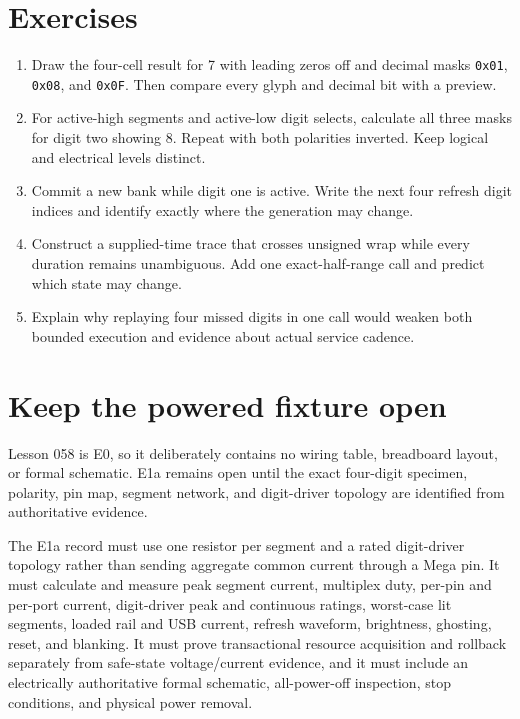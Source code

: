 \documentclass[10pt]{article}
\begin{document}
\section{Exercises}
\begin{enumerate}
 \item Draw the four-cell result for 7 with leading zeros off and decimal
       masks \texttt{0x01}, \texttt{0x08}, and \texttt{0x0F}. Then compare
       every glyph and decimal bit with a preview.
 \item For active-high segments and active-low digit selects, calculate all
       three masks for digit two showing 8. Repeat with both polarities
       inverted. Keep logical and electrical levels distinct.
 \item Commit a new bank while digit one is active. Write the next four
       refresh digit indices and identify exactly where the generation may
       change.
 \item Construct a supplied-time trace that crosses unsigned wrap while every
       duration remains unambiguous. Add one exact-half-range call and predict
       which state may change.
 \item Explain why replaying four missed digits in one call would weaken both
       bounded execution and evidence about actual service cadence.
\end{enumerate}

\section{Keep the powered fixture open}
Lesson 058 is E0, so it deliberately contains no wiring table, breadboard
layout, or formal schematic. E1a remains open until the exact four-digit
specimen, polarity, pin map, segment network, and digit-driver topology are
identified from authoritative evidence.

The E1a record must use one resistor per segment and a rated digit-driver
topology rather than sending aggregate common current through a Mega pin. It
must calculate and measure peak segment current, multiplex duty, per-pin and
per-port current, digit-driver peak and continuous ratings, worst-case lit
segments, loaded rail and USB current, refresh waveform, brightness,
ghosting, reset, and blanking. It must prove transactional resource
acquisition and rollback separately from safe-state voltage/current evidence,
and it must include an electrically authoritative formal schematic,
all-power-off inspection, stop conditions, and physical power removal.
\end{document}
